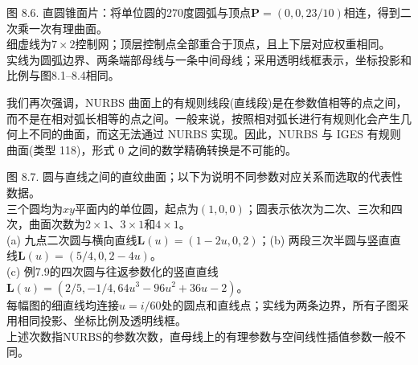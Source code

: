\documentclass[../main.tex]{subfiles}
\begin{document}
\begin{center}
\begin{minipage}{22cm}
\vspace*{.6\baselineskip}
\centering
{}
\par\smallskip
图 8.6. 直圆锥面片：将单位圆的270度圆弧与顶点$\mathbf P=(0,0,23/10)$相连，得到二次乘一次有理曲面。\\
细虚线为$7\times2$控制网；顶层控制点全部重合于顶点，且上下层对应权重相同。\\
实线为圆弧边界、两条端部母线与一条中间母线；采用透明线框表示，坐标投影和比例与图8.1--8.4相同。
\end{minipage}
\end{center}

我们再次强调，NURBS 曲面上的有规则线段(直线段)是在参数值相等的点之间，而不是在相对弧长相等的点之间。一般来说，按照相对弧长进行有规则化会产生几何上不同的曲面，而这无法通过 NURBS 实现。因此，NURBS 与 IGES 有规则曲面(类型 118)，形式 0 \cite{IGE93} 之间的数学精确转换是不可能的。


\begin{center}
\begin{minipage}{36cm}
\vspace*{.6\baselineskip}
\centering
{}
\par\medskip
{}
\par\smallskip
图 8.7. 圆与直线之间的直纹曲面；以下为说明不同参数对应关系而选取的代表性数据。\\
三个圆均为$xy$平面内的单位圆，起点为$(1,0,0)$；圆表示依次为二次、三次和四次，曲面次数为$2\times1$、$3\times1$和$4\times1$。\\
(a) 九点二次圆与横向直线$\mathbf L(u)=(1-2u,0,2)$；(b) 两段三次半圆与竖直直线$\mathbf L(u)=(5/4,0,2-4u)$。\\
(c) 例7.9的四次圆与往返参数化的竖直直线$\mathbf L(u)=(2/5,-1/4,64u^3-96u^2+36u-2)$。\\
每幅图的细直线均连接$u=i/60$处的圆点和直线点；实线为两条边界，所有子图采用相同投影、坐标比例及透明线框。\\
上述次数指NURBS的参数次数，直母线上的有理参数与空间线性插值参数一般不同。
\end{minipage}
\end{center}
\end{document}
